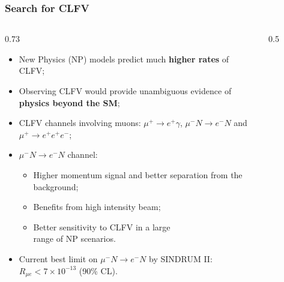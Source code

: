 \documentclass{beamer}
\begin{document}
\begin{frame}
    \frametitle{Search for CLFV}
                \vspace{-2mm}
   \begin{columns}
    \begin{column}{0.73\framewidth}
        \setlength{\leftmargini}{1.5em}
        \begin{itemize}
            \item New Physics (NP) models predict much \textbf{higher rates} of CLFV;
            \vspace{1mm}
            \item Observing CLFV would provide unambiguous evidence of 
            \\ \textbf{physics beyond the SM};
            \vspace{1mm}
            \item CLFV channels involving muons: $\mu^+ \rightarrow e^+ \gamma$, $\mu^- N \rightarrow e^- N$ and $\mu^+ \rightarrow e^+ e^+ e^-$;
            \vspace{1mm}
            \item $\mu^- N \rightarrow e^- N$ channel:
            \begin{itemize}
                \item Higher momentum signal and better separation from the background;
                \item Benefits from high intensity beam;
                \item Better sensitivity to CLFV in a large \\ range of NP scenarios.
            \end{itemize}
            \item Current best limit on $\mu^- N \rightarrow e^- N$ by SINDRUM II: $R_{\mu e} < 7 \times 10^{-13}$ (90\% CL).
        \end{itemize}
    \end{column}
    \begin{column}{0.5\framewidth}
        \begin{figure}[h]
            \centering
            \hspace*{-7.1ex}

\end{figure}
\end{column}
\end{columns}
\end{frame}
\end{document}
